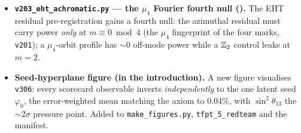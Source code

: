 \documentclass[11pt]{article}
\begin{document}
\begin{itemize}
  split is made an explicit anti-numerology firewall rule: $\phi=2\cos(\pi/5)\in\mathbb Q(\sqrt5)$ is the
  \emph{static} carrier ($\Z/5$) field, every \emph{dynamic} rate is rational ($\mathbb Q$, the $\Z/6$ hand), so a
  dynamic rate explained by $\phi$ is a cross-field false friend (\texttt{v314}/\texttt{v315}).
\item \textbf{\texttt{v203\_eht\_achromatic.py} --- the $\mu_4$ Fourier fourth null (\mX).} The EHT residual
  pre-registration gains a fourth null: the azimuthal residual must carry power \emph{only} at $m\equiv0\bmod4$
  (the $\mu_4$ fingerprint of the four marks, \texttt{v201}); a $\mu_4$-orbit profile has $\sim0$ off-mode power
  while a $\mathbb{Z}_2$ control leaks at $m=2$.
\item \textbf{Seed-hyperplane figure (in the introduction).} A new figure visualises \texttt{v306}:
  every scorecard observable inverts \emph{independently} to the one latent seed $\varphi_0$, the error-weighted
  mean matching the axiom to $0.04\%$, with $\sin^2\theta_{13}$ the $\sim2\sigma$ pressure point. Added to
  \texttt{make\_figures.py}, \texttt{tfpt\_5\_redteam} and the manifest.
\end{itemize}
\end{document}
